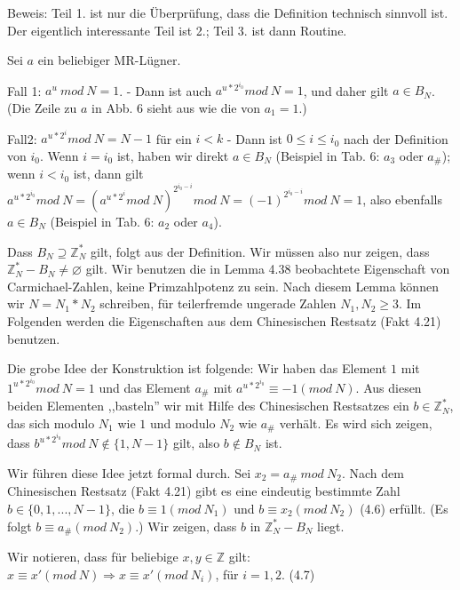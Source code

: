 \documentclass[a4paper]{article}
\begin{document}
\begin{multicols}{3}
        Beweis: Teil 1. ist nur die Überprüfung, dass die Definition technisch sinnvoll ist. Der eigentlich interessante Teil ist 2.; Teil 3. ist dann Routine.
        \begin{enumerate*}
            \item Sei $a$ ein beliebiger MR-Lügner.
            \begin{itemize*}
                \item Fall 1: $a^u\ mod\ N = 1$. - Dann ist auch $a^{u*2^{i_0}} mod\ N = 1$, und daher gilt $a\in B_N$. (Die Zeile zu $a$ in Abb. 6 sieht aus wie die von $a_1=1$.)
                \item Fall2: $a^{u*2^i} mod\ N=N-1$ für ein $i<k$ - Dann ist $0\leq i\leq i_0$ nach der Definition von $i_0$. Wenn $i=i_0$ ist, haben wir direkt $a\in B_N$ (Beispiel in Tab. 6: $a_3$ oder $a_{\#}$); wenn $i<i_0$ ist, dann gilt $a^{u*2^{i_0}} mod\ N=(a^{u*2^{i}} mod\ N)^{2^{i_{0} -i}} mod\ N= (-1)^{2^{i_{0} -i}} mod\ N= 1$, also ebenfalls $a\in B_N$ (Beispiel in Tab. 6: $a_2$ oder $a_4$).
            \end{itemize*}
            \item Dass $B_N\supseteq \mathbb{Z}^*_N$ gilt, folgt aus der Definition. Wir müssen also nur zeigen, dass $\mathbb{Z}^*_N - B_N\not=\varnothing$ gilt. Wir benutzen die in Lemma 4.38 beobachtete Eigenschaft von Carmichael-Zahlen, keine Primzahlpotenz zu sein. Nach diesem Lemma können wir $N=N_1 *N_2$ schreiben, für teilerfremde ungerade Zahlen $N_1,N_2\geq 3$. Im Folgenden werden die Eigenschaften aus dem Chinesischen Restsatz (Fakt 4.21) benutzen.
            \begin{itemize*}
                \item Die grobe Idee der Konstruktion ist folgende: Wir haben das Element $1$ mit $1^{u*2^{i_0}} mod\ N= 1$ und das Element $a_{\#}$ mit $a^{u*2^{i_0}} \equiv -1 (mod\ N)$. Aus diesen beiden Elementen ,,basteln'' wir mit Hilfe des Chinesischen Restsatzes ein $b\in\mathbb{Z}^*_N$, das sich modulo $N_1$ wie $1$ und modulo $N_2$ wie $a_{\#}$ verhält. Es wird sich zeigen, dass $b^{u*2^{i_0}} mod\ N \not\in\{1 ,N-1\}$ gilt, also $b\not\in B_N$ ist.
                \item Wir führen diese Idee jetzt formal durch. Sei $x_2=a_{\#}\ mod\ N_2$. Nach dem Chinesischen Restsatz (Fakt 4.21) gibt es eine eindeutig bestimmte Zahl $b\in\{0,1,...,N- 1\}$, die $b\equiv 1(mod\ N_1)$ und $b\equiv x_2(mod\ N_2)$ (4.6) erfüllt. (Es folgt $b\equiv a_{\#}(mod\ N_2)$.) Wir zeigen, dass $b$ in $\mathbb{Z}^*_N-B_N$ liegt.
                \item Wir notieren, dass für beliebige $x,y\in\mathbb{Z}$ gilt: $x\equiv x'(mod\ N)\Rightarrow x\equiv x'(mod\ N_i)$, für $i=1,2$. (4.7)

\end{itemize*}
\end{enumerate*}
\end{multicols}
\end{document}
